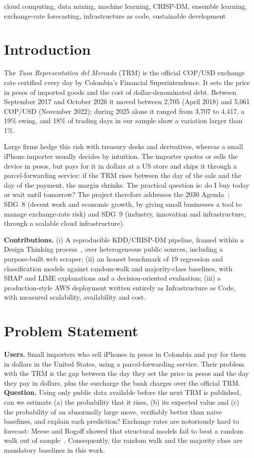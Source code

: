 \documentclass[conference]{IEEEtran}
\begin{document}
\begin{IEEEkeywords}
cloud computing, data mining, machine learning, CRISP-DM, ensemble learning, exchange-rate forecasting, infrastructure as code, sustainable development
\end{IEEEkeywords}

\section{Introduction}
The \emph{Tasa Representativa del Mercado} (TRM) is the official COP/USD exchange rate certified every day by Colombia's Financial Superintendence. It sets the price in pesos of imported goods and the cost of dollar-denominated debt. Between September 2017 and October 2026 it moved between 2{,}705 (April 2018) and 5{,}061 COP/USD (November 2022); during 2025 alone it ranged from 3{,}707 to 4{,}417, a 19\% swing, and 18\% of trading days in our sample show a variation larger than 1\%.

Large firms hedge this risk with treasury desks and derivatives, whereas a small iPhone importer usually decides by intuition. The importer quotes or sells the device in pesos, but pays for it in dollars at a US store and ships it through a parcel-forwarding service: if the TRM rises between the day of the sale and the day of the payment, the margin shrinks. The practical question is: do I buy today or wait until tomorrow? The project therefore addresses the 2030 Agenda~\cite{un2015}: SDG~8 (decent work and economic growth, by giving small businesses a tool to manage exchange-rate risk) and SDG~9 (industry, innovation and infrastructure, through a scalable cloud infrastructure).

\textbf{Contributions.} (i) A reproducible KDD/CRISP-DM pipeline, framed within a Design Thinking process~\cite{brown2008}, over heterogeneous public sources, including a purpose-built web scraper; (ii) an honest benchmark of 19 regression and classification models against random-walk and majority-class baselines, with SHAP and LIME explanations and a decision-oriented evaluation; (iii) a production-style AWS deployment written entirely as Infrastructure as Code, with measured scalability, availability and cost.

\section{Problem Statement}
\textbf{Users.} Small importers who sell iPhones in pesos in Colombia and pay for them in dollars in the United States, using a parcel-forwarding service. Their problem with the TRM is the gap between the day they set the price in pesos and the day they pay in dollars, plus the surcharge the bank charges over the official TRM. \textbf{Question.} Using only public data available before the next TRM is published, can we estimate (a) the probability that it rises, (b) its expected value and (c) the probability of an abnormally large move, verifiably better than naive baselines, and explain each prediction? Exchange rates are notoriously hard to forecast: Meese and Rogoff showed that structural models fail to beat a random walk out of sample~\cite{meese1983}. Consequently, the random walk and the majority class are mandatory baselines in this work.
\end{document}
